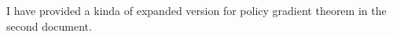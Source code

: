 \documentclass[twocolumn,11pt]{article}
\makeatletter
\DeclareMathOperator{\E}{\mathbb{E}}
\DeclareMathOperator{\w}{\textbf{w}}
\DeclareMathOperator{\vp}{v_\pi} %
\DeclareMathOperator{\bb}{\textbf{b}}
\DeclareMathOperator{\A}{ \textbf{A} }
\DeclareMathOperator{\D}{ \textbf{D} }
\DeclareMathOperator{\x}{\textbf{x}}
\renewcommand{\section}{\@startsection
{section}%
{2}%
{0mm}%
{-0.5\baselineskip}%
{0.5\baselineskip}%
{\bfseries\color{blue}}} %
\renewcommand{\subsection}{\@startsection
{subsection}%
{1}%
{0mm}%
{-0.5\baselineskip}%
{0.5\baselineskip}%
{\bfseries\color{blue}}} %
\makeatother
\begin{document}


I have provided a kinda of  expanded version for policy gradient theorem in the second document.




\end{document}
